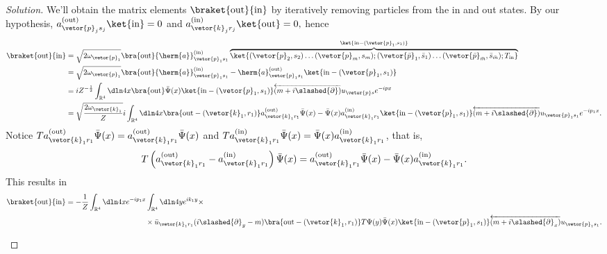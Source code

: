 \begin{proof}[Solution]
   We'll obtain the matrix elements \(\braket{\mathrm{out}}{\mathrm{in}}\) by iteratively removing  particles from the in and out states. By our hypothesis, \(a_{\vetor{p}_j s_j}^{(\mathrm{out})}\ket{\mathrm{in}} = 0\) and \(a_{\vetor{k}_j r_j}^{(\mathrm{in})}\ket{\mathrm{out}} = 0,\) hence
   \begin{align*}
      \braket{\mathrm{out}}{\mathrm{in}} &= \sqrt{2\omega_{\vetor{p}_1}}\bra{\mathrm{out}} {\herm{a}}_{\vetor{p}_1 s_1}^{(\mathrm{in})}\overbrace{\ket{(\vetor{p}_2, s_2) \dots (\vetor{p}_m, s_m); (\vetor{\bar{p}}_1, \bar{s}_1) \dots (\vetor{\bar{p}}_{\bar{m}}, \bar{s}_{\bar{m}}); T_{\mathrm{in}}}}^{\ket{\mathrm{in} - (\vetor{p}_1, s_1)}}\\
                                         &= \sqrt{2\omega_{\vetor{p}_1}}\bra{\mathrm{out}} {\herm{a}}_{\vetor{p}_1 s_1}^{(\mathrm{in})} - {\herm{a}}_{\vetor{p}_1 s_1}^{(\mathrm{out})}\ket{\mathrm{in} - (\vetor{p}_1, s_1)}\\
                                         &= iZ^{-\frac12} \int_{\mathbb{R}^4}\dln4x \bra{\mathrm{out}}\bar{\Psi}(x) \ket{\mathrm{in} - (\vetor{p}_1, s_1)} \overleftarrow{(m + i \slashed{\partial})} u_{\vetor{p}s} e^{-ipx}\\
                                         &=  \sqrt{\frac{2 \omega_{\vetor{k}_1}}{Z}} i  \int_{\mathbb{R}^4} \dln4x \bra{\mathrm{out} - (\vetor{k}_1, r_1)} a^{(\mathrm{out})}_{\vetor{k}_1 r_1} \bar{\Psi}(x)  - \bar{\Psi}(x) a_{\vetor{k}_1r_1}^{(\mathrm{in})} \ket{\mathrm{in}-(\vetor{p}_1, s_1)} \overleftarrow{(m + i \slashed{\partial})} u_{\vetor{p}_1s_1} e^{-ip_1x}.
   \end{align*}
   Notice \(T a_{\vetor{k}_1 r_1}^{(\mathrm{out})} \bar{\Psi}(x) = a_{\vetor{k}_1 r_1}^{(\mathrm{out})} \bar{\Psi}(x) \) and \(T a_{\vetor{k}_1 r_1}^{(\mathrm{in})} \bar{\Psi}(x) = \bar{\Psi}(x) a_{\vetor{k}_1 r_1}^{(\mathrm{in})}\), that is, 
   \begin{equation*}
      T \left(a_{\vetor{k}_1 r_1}^{(\mathrm{out})} - a_{\vetor{k}_1 r_1}^{(\mathrm{in})}\right)\bar{\Psi}(x) = a_{\vetor{k}_1 r_1}^{(\mathrm{out})} \bar{\Psi}(x) - \bar{\Psi}(x) a_{\vetor{k}_1 r_1}^{(\mathrm{in})}.
   \end{equation*}
   This results in
   \begin{align*}
      \braket{\mathrm{out}}{\mathrm{in}} &= -\frac{1}{Z} \int_{\mathbb{R}^4} \dln4x e^{-ip_1 x} \int_{\mathbb{R}^4} \dln4y e^{ik_1 y} \times \\
                                         &{}\phantom{Z \int_{\mathbb{R}^4} \dln4x\int_{\mathbb{R}^4} \dln4y} \times \bar{u}_{\vetor{k}_1r_1} (i \slashed{\partial}_y - m) \bra{\mathrm{out} - (\vetor{k}_1, r_1)} T \Psi(y) \bar{\Psi}(x) \ket{\mathrm{in} - (\vetor{p}_1, s_1)} \overleftarrow{(m + i \slashed{\partial}_x)} u_{\vetor{p}_1s_1}.

\end{align*}
\end{proof}
